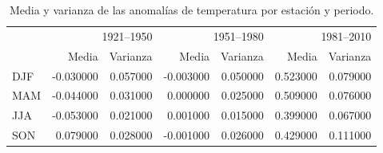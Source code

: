 \begin{table}
\caption{Media y varianza de las anomalías de temperatura por estación y periodo.}
\label{tab:medias-varianzas}
\begin{tabular}{lrrrrrr}
\toprule
 & \multicolumn{2}{r}{1921–1950} & \multicolumn{2}{r}{1951–1980} & \multicolumn{2}{r}{1981–2010} \\
 & Media & Varianza & Media & Varianza & Media & Varianza \\
\midrule
DJF & -0.030000 & 0.057000 & -0.003000 & 0.050000 & 0.523000 & 0.079000 \\
MAM & -0.044000 & 0.031000 & 0.000000 & 0.025000 & 0.509000 & 0.076000 \\
JJA & -0.053000 & 0.021000 & 0.001000 & 0.015000 & 0.399000 & 0.067000 \\
SON & 0.079000 & 0.028000 & -0.001000 & 0.026000 & 0.429000 & 0.111000 \\
\bottomrule
\end{tabular}
\end{table}
